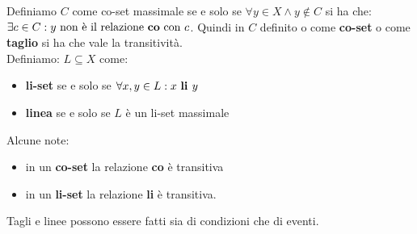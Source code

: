 Definiamo $C$ come co-set massimale  se e solo se $\forall y\in X \land y \notin C$ si ha che: $\exists c\in C: y \mbox{ non è il relazione \textbf{co}  con } c$. Quindi in $C$ definito o come \textbf{co-set} o come \textbf{taglio} si ha che vale la transitività.\\
  
Definiamo: $L\subseteq X$ come:
\begin{itemize}
    \item \textbf{li-set}  se e solo se $\forall x,y\in L:  x\mbox{ \textbf{li }}y$
    \item \textbf{linea}  se e solo se $L$ è un li-set massimale
\end{itemize}

Alcune note:
\begin{itemize}
    \item in un \textbf{co-set} la relazione \textbf{co} è transitiva
    \item in un \textbf{li-set} la relazione \textbf{li} è transitiva.
\end{itemize}
Tagli e linee possono essere fatti sia di condizioni che di eventi.